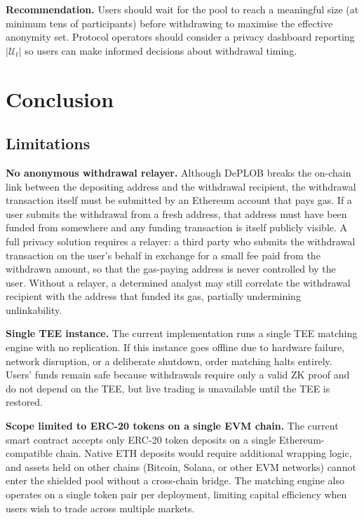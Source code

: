 \documentclass[12pt,a4paper]{article}
\begin{document}
\textbf{Recommendation.} Users should wait for the pool to reach a meaningful size (at minimum tens of participants) before withdrawing to maximise the effective anonymity set. Protocol operators should consider a privacy dashboard reporting $|\mathcal{U}_t|$ so users can make informed decisions about withdrawal timing.

\section{Conclusion}
\subsection{Limitations}

\textbf{No anonymous withdrawal relayer.} Although DePLOB breaks the on-chain link between the depositing address and the withdrawal recipient, the withdrawal transaction itself must be submitted by an Ethereum account that pays gas. If a user submits the withdrawal from a fresh address, that address must have been funded from somewhere and any funding transaction is itself publicly visible. A full privacy solution requires a relayer: a third party who submits the withdrawal transaction on the user's behalf in exchange for a small fee paid from the withdrawn amount, so that the gas-paying address is never controlled by the user. Without a relayer, a determined analyst may still correlate the withdrawal recipient with the address that funded its gas, partially undermining unlinkability.

\textbf{Single TEE instance.} The current implementation runs a single TEE matching engine with no replication. If this instance goes offline due to hardware failure, network disruption, or a deliberate shutdown, order matching halts entirely. Users' funds remain safe because withdrawals require only a valid ZK proof and do not depend on the TEE, but live trading is unavailable until the TEE is restored. 

\textbf{Scope limited to ERC-20 tokens on a single EVM chain.} The current smart contract accepts only ERC-20 token deposits on a single Ethereum-compatible chain. Native ETH deposits would require additional wrapping logic, and assets held on other chains (Bitcoin, Solana, or other EVM networks) cannot enter the shielded pool without a cross-chain bridge. The matching engine also operates on a single token pair per deployment, limiting capital efficiency when users wish to trade across multiple markets.
\end{document}
